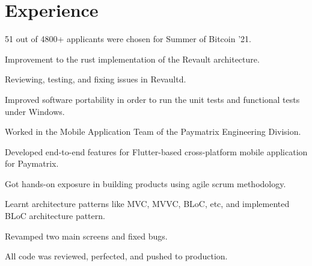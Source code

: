 \documentclass[letterpaper]{deedy-resume} %
\begin{document}
%
\begin{minipage}[t]{0.66\textwidth} %


\section{Experience}


\vspace{\topsep} %
\begin{tightitemize}
\item 51 out of 4800+ applicants were chosen for Summer of Bitcoin '21.
\item Improvement to the rust implementation of the Revault architecture.
\item Reviewing, testing, and fixing issues in Revaultd.
\item Improved software portability in order to run the unit tests and functional tests under Windows.
\end{tightitemize}

\sectionspace %



\begin{tightitemize}
\item Worked in the Mobile Application Team of the Paymatrix Engineering Division.
\item Developed end-to-end features for Flutter-based cross-platform mobile application for Paymatrix.
\item Got hands-on exposure in building products using agile scrum methodology.
\item Learnt architecture patterns like MVC, MVVC, BLoC, etc, and implemented BLoC architecture pattern.
\item Revamped two main screens and fixed bugs.
\item All code was reviewed, perfected, and pushed to production.
\end{tightitemize}


\end{minipage}
\end{document}
